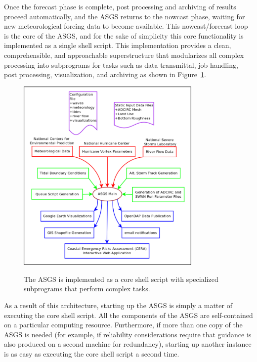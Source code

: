 \documentclass[jmse,article,submit,moreauthors,pdftex,12pt,a4paper]{mdpi}
\begin{document}
Once the forecast phase is complete, post processing and archiving 
of results proceed automatically, and the ASGS returns to the 
nowcast phase, waiting for new meteorological forcing data to become 
available. This nowcast/forecast loop is the core of the ASGS, and 
for the sake of simplicity this core functionality is implemented as 
a single shell script. This implementation provides a clean, 
comprehensible, and approachable superstructure that modularizes all 
complex processing into subprograms for tasks such as data 
transmittal, job handling, post processing, visualization, and 
archiving as shown in Figure~\ref{fig:asgs_structure}.

\begin{figure}[t]
  \centering
  \includegraphics[width=0.8\textwidth]{asgs_structure_color}\\
  \caption{The ASGS is implemented as a core shell script with specialized subprograms that perform complex tasks.}
  \label{fig:asgs_structure}
\end{figure}


As a result of this architecture, starting up the ASGS is simply a 
matter of executing the core shell script. All the components of the 
ASGS are self-contained on a particular computing resource. 
Furthermore, if more than one copy of the ASGS is needed (for 
example, if reliability considerations require that guidance is also 
produced on a second machine for redundancy), starting up another 
instance is as easy as executing the core shell script a second time.
\end{document}
